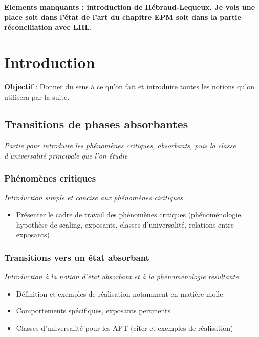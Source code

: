 \documentclass[10pt,a4paper]{article}
\begin{document}
\textbf{Elements manquants : introduction de Hébraud-Lequeux. Je vois une place soit dans l'état de l'art du chapitre EPM soit dans la partie réconciliation avec LHL.}

\tableofcontents

\section{Introduction}

\textbf{Objectif} : Donner du sens à ce qu'on fait et introduire toutes les notions qu'on utilisera par la suite.

\subsection{Transitions de phases absorbantes}

\textit{Partie pour introduire les phénomènes critiques, absorbants, puis la classe d'universalité principale que l'on étudie}

\subsubsection{Phénomènes critiques}

\textit{Introduction simple et concise aux phénomènes ciritiques}

\begin{itemize}
	\item Présenter le cadre de travail des phénomènes critiques (phénoménologie, hypothèse de scaling, exposants, classes d'universalité, relations entre exposants)
\end{itemize}

\subsubsection{Transitions vers un état absorbant}

\textit{Introduction à la notion d'état absorbant et à la phénoménologie résultante}

\begin{itemize}
	\item Définition et exemples de réalisation notamment en matière molle.
	\item Comportements spécifiques, exposants pertinents
	\item Classes d'universalité pour les APT (citer et exemples de réalisation)
\end{itemize}
\end{document}
